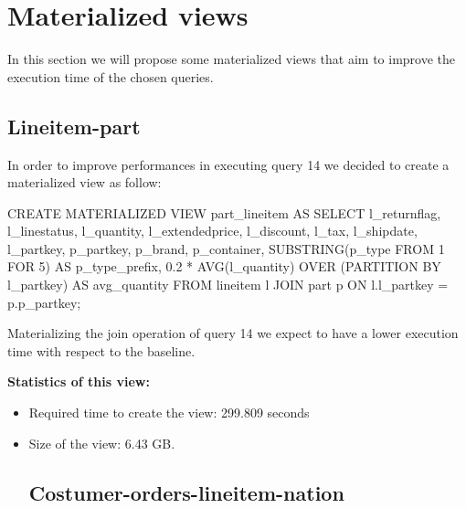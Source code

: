 \section{Materialized views}
In this section we will propose some materialized views that aim to improve the execution time of the chosen queries.
\subsection{Lineitem-part}
In order to improve performances in executing query 14 we decided to create a materialized view as follow:
\begin{sql}
CREATE MATERIALIZED VIEW part_lineitem AS
SELECT
    l_returnflag,
    l_linestatus,
    l_quantity,
    l_extendedprice,
    l_discount,
    l_tax,
    l_shipdate,
    l_partkey,
    p_partkey,
    p_brand,
    p_container,
    SUBSTRING(p_type FROM 1 FOR 5) AS p_type_prefix,
    0.2 * AVG(l_quantity) OVER (PARTITION BY l_partkey) AS avg_quantity
FROM
    lineitem l
JOIN
    part p ON l.l_partkey = p.p_partkey;
\end{sql}
Materializing the join operation of query 14 we expect to have a lower execution time with respect to the baseline.

\textbf{Statistics of this view:}
\begin{itemize}
    \item Required time to create the view: 299.809 seconds
    \item Size of the view: 6.43 GB.

\subsection{Costumer-orders-lineitem-nation}
            
\end{itemize}


